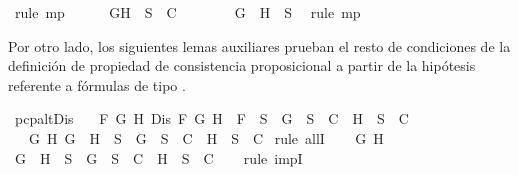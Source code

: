 \begin{isabellebody}
\ {\isacharparenleft}rule\ mp{\isacharparenright}\isanewline
\ \ \ \ \isamarkupfalse%
\ {\isachardoublequoteopen}{\isacharbraceleft}G{\isacharcomma}\isactrlbold {\isasymnot}H{\isacharbraceright}\ {\isasymunion}\ S\ {\isasymin}\ C{\isachardoublequoteclose}\isanewline
\ \ \ \ \ \ \isamarkupfalse%
\ {\isacartoucheopen}\isactrlbold {\isasymnot}{\isacharparenleft}G\ \isactrlbold {\isasymrightarrow}\ H{\isacharparenright}\ {\isasymin}\ S{\isacartoucheclose}\ \isamarkupfalse%
\ {\isacharparenleft}rule\ mp{\isacharparenright}\isanewline
\ \ \isamarkupfalse%
\isanewline
{}\isamarkupfalse%
%
\endisatagproof
{\isafoldproof}%
%
\isadelimproof
%
\endisadelimproof
%
\begin{isamarkuptext}%
Por otro lado, los siguientes lemas auxiliares prueban el resto de condiciones de la
  definición de propiedad de consistencia proposicional a partir de la hipótesis referente a 
  fórmulas de tipo \isa{{\isasymbeta}}.%
\end{isamarkuptext}\isamarkuptrue%
\isamarkupfalse%
\ pcp{\isacharunderscore}alt{}Dis{}{\isacharcolon}\isanewline
\ \ \ {\isachardoublequoteopen}{\isasymforall}F\ G\ H{\isachardot}\ Dis\ F\ G\ H\ {\isasymlongrightarrow}\ F\ {\isasymin}\ S\ {\isasymlongrightarrow}\ {\isacharbraceleft}G{\isacharbraceright}\ {\isasymunion}\ S\ {\isasymin}\ C\ {\isasymor}\ {\isacharbraceleft}H{\isacharbraceright}\ {\isasymunion}\ S\ {\isasymin}\ C{\isachardoublequoteclose}\isanewline
\ \ \ {\isachardoublequoteopen}{\isasymforall}G\ H{\isachardot}\ G\ \isactrlbold {\isasymor}\ H\ {\isasymin}\ S\ {\isasymlongrightarrow}\ {\isacharbraceleft}G{\isacharbraceright}\ {\isasymunion}\ S\ {\isasymin}\ C\ {\isasymor}\ {\isacharbraceleft}H{\isacharbraceright}\ {\isasymunion}\ S\ {\isasymin}\ C{\isachardoublequoteclose}\isanewline
%
\isadelimproof
%
\endisadelimproof
%
\isatagproof
{}\isamarkupfalse%
\ {\isacharparenleft}rule\ allI{\isacharparenright}{\isacharplus}\isanewline
\ \ \isamarkupfalse%
\ G\ H\isanewline
\ \ \isamarkupfalse%
\ {\isachardoublequoteopen}G\ \isactrlbold {\isasymor}\ H\ {\isasymin}\ S\ {\isasymlongrightarrow}\ {\isacharbraceleft}G{\isacharbraceright}\ {\isasymunion}\ S\ {\isasymin}\ C\ {\isasymor}\ {\isacharbraceleft}H{\isacharbraceright}\ {\isasymunion}\ S\ {\isasymin}\ C{\isachardoublequoteclose}\isanewline
\ \ \isamarkupfalse%
\ {\isacharparenleft}rule\ impI{\isacharparenright}\isanewline

\end{isabellebody}
